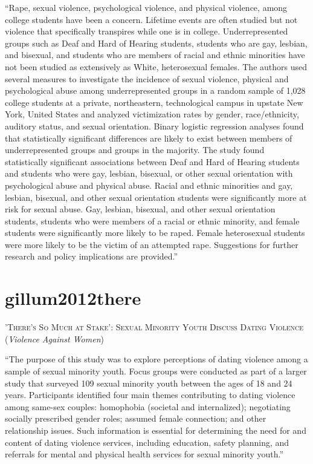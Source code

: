 \documentclass[]{tufte-handout}
\begin{document}
``Rape, sexual violence, psychological violence, and physical violence,
among college students have been a concern. Lifetime events are often
studied but not violence that specifically transpires while one is in
college. Underrepresented groups such as Deaf and Hard of Hearing
students, students who are gay, lesbian, and bisexual, and students who
are members of racial and ethnic minorities have not been studied as
extensively as White, heterosexual females. The authors used several
measures to investigate the incidence of sexual violence, physical and
psychological abuse among underrepresented groups in a random sample of
1,028 college students at a private, northeastern, technological campus
in upstate New York, United States and analyzed victimization rates by
gender, race/ethnicity, auditory status, and sexual orientation. Binary
logistic regression analyses found that statistically significant
differences are likely to exist between members of underrepresented
groups and groups in the majority. The study found statistically
significant associations between Deaf and Hard of Hearing students and
students who were gay, lesbian, bisexual, or other sexual orientation
with psychological abuse and physical abuse. Racial and ethnic
minorities and gay, lesbian, bisexual, and other sexual orientation
students were significantly more at risk for sexual abuse. Gay, lesbian,
bisexual, and other sexual orientation students, students who were
members of a racial or ethnic minority, and female students were
significantly more likely to be raped. Female heterosexual students were
more likely to be the victim of an attempted rape. Suggestions for
further research and policy implications are provided.''

\section{\texorpdfstring{\textcolor[HTML]{5b0057}{gillum2012there}}{}}\label{section-48}

\textsc{\large{'There's So Much at Stake': Sexual Minority Youth Discuss Dating Violence}}
(\emph{Violence Against Women})

``The purpose of this study was to explore perceptions of dating
violence among a sample of sexual minority youth. Focus groups were
conducted as part of a larger study that surveyed 109 sexual minority
youth between the ages of 18 and 24 years. Participants identified four
main themes contributing to dating violence among same-sex couples:
homophobia (societal and internalized); negotiating socially prescribed
gender roles; assumed female connection; and other relationship issues.
Such information is essential for determining the need for and content
of dating violence services, including education, safety planning, and
referrals for mental and physical health services for sexual minority
youth.''
\end{document}
